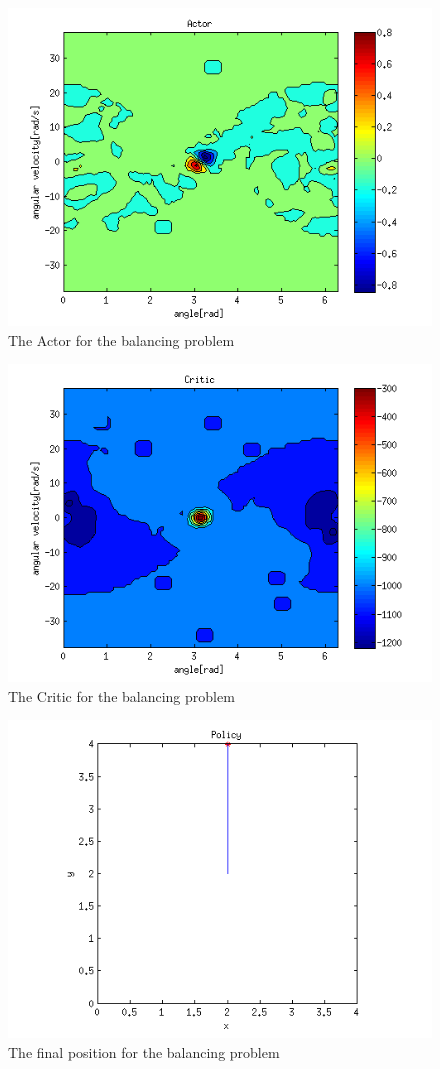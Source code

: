 \documentclass{article}
\begin{document}
\begin{figure}[h!]
    \centering
    \includegraphics[width=.7\textwidth]{actor_balancing.png}
    \caption{The Actor for the balancing problem}
    \label{fig:actor_balancing}
\end{figure}

\begin{figure}[h!]
    \centering
    \includegraphics[width=.7\textwidth]{critic_balancing.png}
    \caption{The Critic for the balancing problem}
    \label{fig:critic_balancing}
\end{figure}

\begin{figure}[h!]
    \centering
    \includegraphics[width=.7\textwidth]{result_balancing.png}
    \caption{The final position for the balancing problem}
    \label{fig:result_balancing}
\end{figure}
\end{document}
